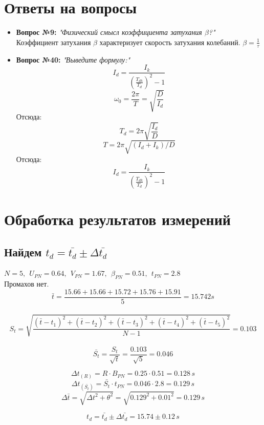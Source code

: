 \documentclass[a4paper,12pt]{report}
\begin{document}
\newpage
\section*{Ответы на вопросы}

\begin{itemize}
    \item \textbf{Вопрос №9:}
    	\textit{"Физический смысл коэффициента затухания $\beta$?"} \\
        Коэффициент затухания $\beta$ характеризует скорость затухания колебаний. $\beta = \frac{1}{\tau}$
    \item \textbf{Вопрос №40:}
        \textit{"Выведите формулу:"}
         \[ I_d = \frac{I_k}{(\frac{T_{dk}}{T_d})^2-1} \]
         \[ \omega_0 = \frac{2\pi}{T} = \sqrt{\frac{D}{I_{d}}} \]
         Отсюда:
         \[ T_d = 2\pi\sqrt{\frac{I_d}{D}} \]
         \[ T = 2\pi \sqrt{(I_d + I_k)/D} \]
         Отсюда:
         \[ I_d = \frac{I_k}{(\frac{T_{dk}}{T_d})^2-1} \]
        
\end{itemize}

\newpage

\section*{Обработка результатов измерений}

\subsection*{Найдем $t_d = \bar{t_d} \pm \Delta \bar{t_d}$}

$N=5,\ \ U_{PN}=0.64,\ \ V_{PN}=1.67,\ \ \beta_{PN}=0.51,\ \ t_{PN}=2.8$\\
Промахов нет.\\
\[\bar{t}= \frac{15.66+15.66+15.72+15.76+15.91}{5} =15.742 s\] \\
\[S_{t}=\sqrt{\frac{(\bar{t}-{t}_1)^2+(\bar{t}-{t}_2)^2+(\bar{t}-{t}_3)^2+(\bar{t}-{t}_4)^2+(\bar{t}-{t}_5)^2}{N-1}} = 0.103\]\\

\[\bar{S_{t}}=\frac{S_{t}}{\sqrt{t}}=\frac{0.103}{\sqrt{5}}=0.046\]

\[\Delta{t}_{(R)}=R\cdot B_{PN}=0.25\cdot 0.51=0.128 \, s\]
\[\Delta{t}_{(\bar{S_{t}})}=\bar{S_t}\cdot t_{PN}=0.046\cdot 2.8=0.129 \, s\]
\[\Delta{\bar{t}}=\sqrt{\Delta t^2 + \theta^2}=\sqrt{0.129^2 + 0.01^2}=0.129 \, s\]

\[{t_d}=\bar{t_d}\pm \Delta{\bar{t_d}}=15.74\pm 0.12 \, s\]
\end{document}
